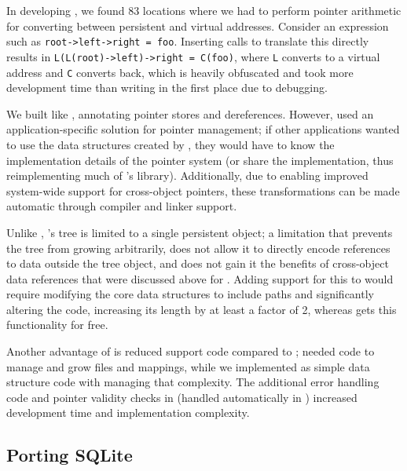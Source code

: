 {    In developing \unixrbt, we found 83 locations where we had to perform pointer arithmetic for
    converting between persistent and virtual addresses.  Consider an expression such as
    \texttt{root->left->right = foo}. Inserting calls to translate this directly results in
    \texttt{L(L(root)->left)->right = C(foo)}, where \texttt{L} converts to a virtual address and
    \texttt{C} converts back, which is heavily obfuscated and took more development time than writing
    \ramrbt in the first place due to debugging.

    We built \nvrbt like \unixrbt, annotating pointer stores and
    dereferences. However, \unixrbt used an application-specific solution for pointer
    management; if other applications wanted to use the data structures created by \unixrbt, they would
    have to know the implementation details of the pointer system (or share the implementation, thus
    reimplementing much of \Twizzler's library).  Additionally, due to \Twizzler enabling improved
    system-wide support for cross-object pointers, these transformations can be made automatic through
    compiler and linker support.

    Unlike \nvrbt, \unixrbt's tree is limited to a single persistent
    object; a limitation that prevents the tree from growing arbitrarily, does not
    allow it to directly encode references to data outside the tree object, and does
    not gain it the benefits of cross-object data references that were discussed
    above for \nvkv. Adding support for this to \unixrbt would require modifying the
    core data structures to include paths and significantly altering the code,
    increasing its length by at least a factor of 2, whereas \nvrbt gets this
    functionality for free.

    Another advantage of \nvrbt is reduced support code compared to \unixrbt; \unixrbt needed
    code to manage and grow files and mappings, while we implemented \nvrbt as simple data structure code
    with \Twizzler managing that complexity. The additional error handling code and pointer
    validity checks in \unixrbt (handled automatically in \Twizzler) increased development time
    and implementation complexity.


    \subsection{Porting SQLite}

}

